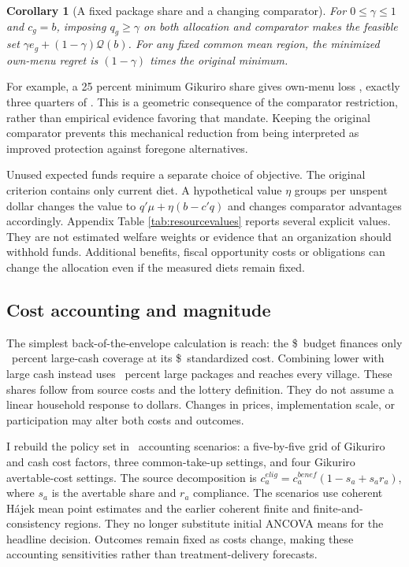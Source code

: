 \documentclass[11pt]{article}
\newtheorem{corollary}{Corollary}
\begin{document}
\begin{corollary}[A fixed package share and a changing comparator]\label{cor:mandate}
For $0\leq\gamma\leq1$ and $c_g=b$, imposing $q_g\geq\gamma$ on both allocation and comparator makes the feasible set $\gamma e_g+(1-\gamma)\mathcal Q(b)$. For any fixed common mean region, the minimized own-menu regret is $(1-\gamma)$ times the original minimum.
\end{corollary}

For example, a 25 percent minimum Gikuriro share gives own-menu loss \MinimumGKOwnLoss, exactly three quarters of \TightMeanLoss. This is a geometric consequence of the comparator restriction, rather than empirical evidence favoring that mandate. Keeping the original comparator prevents this mechanical reduction from being interpreted as improved protection against foregone alternatives.

Unused expected funds require a separate choice of objective. The original criterion contains only current diet. A hypothetical value $\eta$ groups per unspent dollar changes the value to $q'\mu+\eta(b-c'q)$ and changes comparator advantages accordingly. Appendix Table \ref{tab:resourcevalues} reports several explicit values. They are not estimated welfare weights or evidence that an organization should withhold funds. Additional benefits, fiscal opportunity costs or obligations can change the allocation even if the measured diets remain fixed.

\subsection{Cost accounting and magnitude}

The simplest back-of-the-envelope calculation is reach: the \$\GikuriroCost\ budget finances only \LargeCoverage\ percent large-cash coverage at its \$\LargeCost\ standardized cost. Combining lower with large cash instead uses \LowerLargeShare\ percent large packages and reaches every village. These shares follow from source costs and the lottery definition. They do not assume a linear household response to dollars. Changes in prices, implementation scale, or participation may alter both costs and outcomes.

I rebuild the policy set in \CostScenarioN\ accounting scenarios: a five-by-five grid of Gikuriro and cash cost factors, three common-take-up settings, and four Gikuriro avertable-cost settings. The source decomposition is $c_a^{elig}=c_a^{benef}(1-s_a+s_ar_a)$, where $s_a$ is the avertable share and $r_a$ compliance. The scenarios use coherent H\'ajek mean point estimates and the earlier coherent finite and finite-and-consistency regions. They no longer substitute initial ANCOVA means for the headline decision. Outcomes remain fixed as costs change, making these accounting sensitivities rather than treatment-delivery forecasts.
\end{document}
